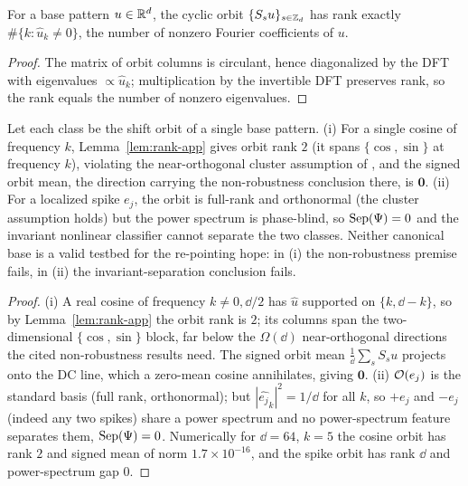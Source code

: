 \begin{lemma}\label{lem:rank-app}
For a base pattern $u\in\mathbb{R}^d$, the cyclic orbit $\{S_su\}_{s\in\mathbb{Z}_d}$ has rank
exactly $\#\{k:\hat u_k\neq0\}$, the number of nonzero Fourier coefficients of
$u$.
\end{lemma}
\begin{proof}
The matrix of orbit columns is circulant, hence diagonalized by the DFT with
eigenvalues $\propto\hat u_k$; multiplication by the invertible DFT preserves
rank, so the rank equals the number of nonzero eigenvalues.
\end{proof}

\begin{proposition}
\label{prop:rank-app}
Let each class be the shift orbit of a single base pattern. (i) For a single
cosine of frequency $k$, Lemma~\ref{lem:rank-app} gives orbit rank $2$ (it spans
$\{\cos,\sin\}$ at frequency $k$), violating the near-orthogonal cluster
assumption of \citet{frei2023double,li2025feature}, and the signed orbit mean, the
direction carrying the non-robustness conclusion there, is $\mathbf 0$. (ii) For a
localized spike $e_j$, the orbit is full-rank and orthonormal (the cluster
assumption holds) but the power spectrum is phase-blind, so $\mathrm{Sep}(\Psi)=0$ and the
invariant nonlinear classifier cannot separate the two classes. Neither canonical
base is a valid testbed for the re-pointing hope: in (i) the non-robustness
premise fails, in (ii) the invariant-separation conclusion fails.
\end{proposition}
\begin{proof}
(i) A real cosine of frequency $k\neq0,\dd/2$ has $\hat u$ supported on
$\{k,\dd-k\}$, so by Lemma~\ref{lem:rank-app} the orbit rank is $2$; its columns
span the two-dimensional $\{\cos,\sin\}$ block, far below the $\Omega(\dd)$
near-orthogonal directions the cited non-robustness results need. The signed
orbit mean $\tfrac1\dd\sum_sS_su$ projects onto the DC line, which a zero-mean
cosine annihilates, giving $\mathbf 0$. (ii) $\mathcal O(e_j)$ is the standard basis
(full rank, orthonormal); but $|\widehat{e_j}_k|^2=1/\dd$ for all $k$, so
$+e_j$ and $-e_j$ (indeed any two spikes) share a power spectrum and no
power-spectrum feature separates them, $\mathrm{Sep}(\Psi)=0$. Numerically for $\dd=64$,
$k=5$ the cosine orbit has rank $2$ and signed mean of norm $1.7\times10^{-16}$,
and the spike orbit has rank $\dd$ and power-spectrum gap $0$.
\end{proof}

